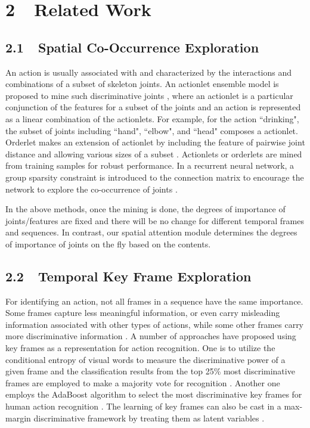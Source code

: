 \documentclass[letterpaper]{article}
\begin{document}
\section{2~~Related Work}
\label{sec:relatedwork}

\subsection{2.1~~Spatial Co-Occurrence Exploration}
\label{subsec:Cooccurrence}
An action is usually associated with and characterized by the interactions and combinations of a subset of skeleton joints. An actionlet ensemble model is proposed to mine such discriminative joints \cite{CVPR12Actionlet}, where an actionlet is a particular conjunction of the features for a subset of the joints and an action is represented as a linear combination of the actionlets. For example, for the action ``drinking", the subset of joints including ``hand", ``elbow", and ``head" composes a actionlet. Orderlet makes an extension of actionlet by including the feature of pairwise joint distance and allowing various sizes of a subset \cite{yu2014discriminative}. Actionlets or orderlets are mined from training samples for robust performance. In a recurrent neural network, a group sparsity constraint is introduced to the connection matrix to encourage the network to explore the co-occurrence of joints \cite{zhu2015co}.


In the above methods, once the mining is done, the degrees of importance of joints/features are fixed and there will be no change for different temporal frames and sequences. In contrast, our spatial attention module determines the degrees of importance of joints on the fly based on the contents.

\subsection{2.2~~Temporal Key Frame Exploration}
For identifying an action, not all frames in a sequence have the same importance. Some frames capture less meaningful information, or even carry misleading information associated with other types of actions, while some other frames carry more discriminative information \cite{liu2013boosted}. A number of approaches have proposed  using key frames as a representation for action recognition. One is to utilize the conditional entropy of visual words to measure the discriminative power of a given frame and the classification results from the top 25\% most discriminative frames are employed to make a majority vote for recognition \cite{BMVC08Information}. Another one employs the AdaBoost algorithm to select the most discriminative key frames for human action recognition \cite{liu2013boosted}. The learning of key frames can also be cast in a max-margin discriminative framework by treating them as latent variables \cite{raptis2013poselet}.
\end{document}
